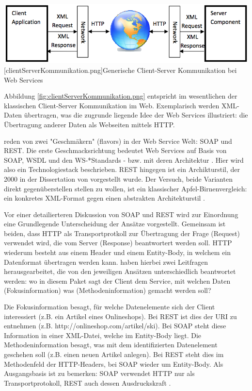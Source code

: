 \documentclass[12pt,a4paper,bibliography=totocnumbered,listof=totoc]{scrartcl}
\begin{document}
\vspace{1em}
\begin{minipage}{\linewidth}
	\centering
	\includegraphics[width=0.7\linewidth]{Abbildungen/clientServerKommunikation.png}
	[clientServerKommunikation.png]{Generische Client-Server Kommunikation bei Web Services}
	\label{fig:clientServerKommunikation.png}
\end{minipage}
\vspace{1em}

Abbildung \ref{fig:clientServerKommunikation.png} entspricht im wesentlichen der klassischen Client-Server Kommunikation im Web. Exemplarisch werden XML-Daten übertragen, was die zugrunde liegende Idee der Web Services illustriert: die Übertragung anderer Daten als Webseiten mittels HTTP.

\citet{wilde11} reden von zwei "Geschmäkern" (flavors) in der Web Service Welt: SOAP und REST. Die erste Geschmacksrichtung bedeutet Web Services \glqq auf Basis von SOAP, WSDL und den WS-*Standards - bzw. mit deren Architektur\grqq{} \citep{tilkov11}. Hier wird also ein Technologiestack beschrieben. REST hingegen ist ein Archikturstil, der 2000 in der Dissertation von \citeauthor{fielding00} vorgestellt wurde. Der Versuch, beide Varianten direkt gegenüberstellen stellen zu wollen, ist ein \glqq [...] klassischer Apfel-Birnenvergleich: ein konkretes XML-Format gegen einen abstrakten Architekturstil\grqq{} \citep{tilkov11}.

Vor einer detailierteren Diskussion von SOAP und REST wird zur Einordnung eine Grundlegende Unterscheidung der Ansätze vorgestellt. Gemeinsam ist beiden, dass HTTP als Transportprotkoll zur Übertragung der Frage (Request) verwendet wird, die vom Server (Response) beantwortert werden soll. HTTP wiederum besteht aus einem Header und einem Entity-Body, in welchem ein Datenformat übertragen werden kann. \citet{richardson07} haben hierbei zwei Leitfragen herausgearbeitet, die von den jeweiligen Ansätzen unterschiedlich beantwortet werden: wo in diesem Paket sagt der Client dem Service, mit welchen Daten (Fokusinformation) was (Methodeninformation) gemacht werden soll?

Die Fokusinformation besagt, für welche Datenelemente sich der Client interessiert (z.B. ein Artikel eines Onlineshops). Bei REST ist dies der URI zu entnehmen (z.B. http://onlineshop.com/artikel/ski). Bei SOAP steht diese Information in einer XML-Datei, welche im Entity-Body liegt. Die Methodeninformation besagt, was mit dem identifizierten Datenelement geschehen soll (z.B. einen neuen Artikel anlegen). Bei REST steht dies im Methodenfeld der HTTP-Headers, bei SOAP wieder um Entity-Body. Als Ausgangsbasis ist zu bemerken: SOAP verwendet HTTP nur als Transportprotokoll, REST auch dessen Ausdruckskraft \citep{wilde11}.
\end{document}
